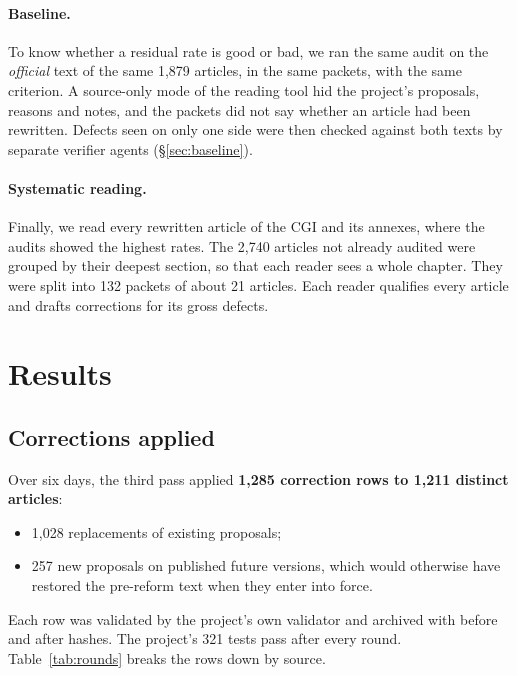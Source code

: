 \documentclass[11pt,a4paper]{article}
\begin{document}
\paragraph{Baseline.}
To know whether a residual rate is good or bad, we ran the same audit on the \emph{official} text of the same 1{,}879 articles, in the same packets, with the same criterion. A source-only mode of the reading tool hid the project's proposals, reasons and notes, and the packets did not say whether an article had been rewritten. Defects seen on only one side were then checked against both texts by separate verifier agents (\S\ref{sec:baseline}).

\paragraph{Systematic reading.}
Finally, we read every rewritten article of the CGI and its annexes, where the audits showed the highest rates. The 2{,}740 articles not already audited were grouped by their deepest section, so that each reader sees a whole chapter. They were split into 132 packets of about 21 articles. Each reader qualifies every article and drafts corrections for its gross defects.

\section{Results}
\label{sec:results}

\subsection{Corrections applied}

Over six days, the third pass applied \textbf{1{,}285 correction rows to 1{,}211 distinct articles}:
\begin{itemize}
  \item 1{,}028 replacements of existing proposals;
  \item 257 new proposals on published future versions, which would otherwise have restored the pre-reform text when they enter into force.
\end{itemize}
Each row was validated by the project's own validator and archived with before and after hashes. The project's 321 tests pass after every round. Table~\ref{tab:rounds} breaks the rows down by source.
\end{document}
